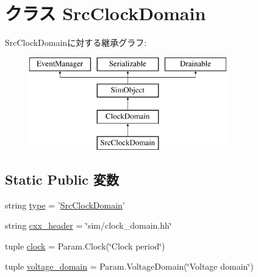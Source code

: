 \hypertarget{classClockDomain_1_1SrcClockDomain}{
\section{クラス SrcClockDomain}
\label{classClockDomain_1_1SrcClockDomain}
}
SrcClockDomainに対する継承グラフ:\begin{figure}[H]
\begin{center}
\leavevmode
\includegraphics[height=4cm]{classClockDomain_1_1SrcClockDomain}
\end{center}
\end{figure}
\subsection*{Static Public 変数}
\begin{DoxyCompactItemize}
\item 
string \hyperlink{classClockDomain_1_1SrcClockDomain_acce15679d830831b0bbe8ebc2a60b2ca}{type} = '\hyperlink{classClockDomain_1_1SrcClockDomain}{SrcClockDomain}'
\item 
string \hyperlink{classClockDomain_1_1SrcClockDomain_a17da7064bc5c518791f0c891eff05fda}{cxx\_\-header} = \char`\"{}sim/clock\_\-domain.hh\char`\"{}
\item 
tuple \hyperlink{classClockDomain_1_1SrcClockDomain_a8824700cf5ea6cdc0f9d75f540668df9}{clock} = Param.Clock(\char`\"{}Clock period\char`\"{})
\item 
tuple \hyperlink{classClockDomain_1_1SrcClockDomain_a8dcad321029dbe3573c158112be45c8c}{voltage\_\-domain} = Param.VoltageDomain(\char`\"{}Voltage domain\char`\"{})
\end{DoxyCompactItemize}



